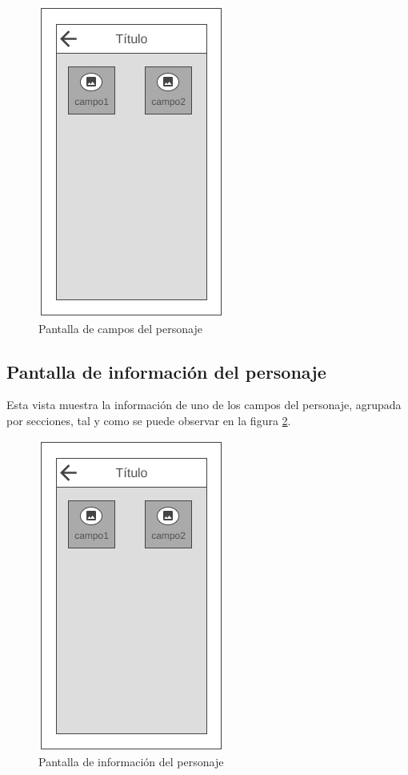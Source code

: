 \begin{figure}[H]
    \centering
    \includegraphics[scale=0.3]{Figures/Mockups/Mock_CamposPersonaje.png}
    \caption{Pantalla de campos del personaje}
    \label{CamposPersonaje}    
\end{figure}

\subsection{Pantalla de información del personaje}
Esta vista muestra la información de uno de los campos del personaje, agrupada por secciones, tal y como 
se puede observar en la figura \ref*{InfoPersonaje}.


\begin{figure}[H]
    \centering
    \includegraphics[scale=0.3]{Figures/Mockups/Mock_CamposPersonaje.png}
    \caption{Pantalla de información del personaje}
    \label{InfoPersonaje}    
\end{figure}

